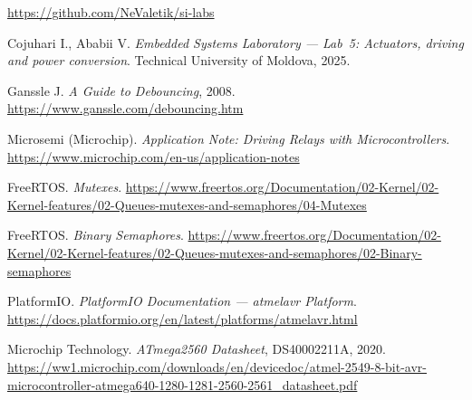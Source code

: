 \documentclass[12pt]{article}
\begin{document}
\begin{thebibliography}{}

  \url{https://github.com/NeValetik/si-labs}

  Cojuhari I., Ababii V. \textit{Embedded Systems Laboratory --- Lab~5: Actuators, driving and power conversion}.
  Technical University of Moldova, 2025.

  Ganssle J. \textit{A Guide to Debouncing}, 2008.
  \url{https://www.ganssle.com/debouncing.htm}

  Microsemi (Microchip). \textit{Application Note: Driving Relays with Microcontrollers}.
  \url{https://www.microchip.com/en-us/application-notes}

  FreeRTOS. \textit{Mutexes}.
  \url{https://www.freertos.org/Documentation/02-Kernel/02-Kernel-features/02-Queues-mutexes-and-semaphores/04-Mutexes}

  FreeRTOS. \textit{Binary Semaphores}.
  \url{https://www.freertos.org/Documentation/02-Kernel/02-Kernel-features/02-Queues-mutexes-and-semaphores/02-Binary-semaphores}

  PlatformIO. \textit{PlatformIO Documentation --- atmelavr Platform}.
  \url{https://docs.platformio.org/en/latest/platforms/atmelavr.html}

  Microchip Technology. \textit{ATmega2560 Datasheet}, DS40002211A, 2020.
  \url{https://ww1.microchip.com/downloads/en/devicedoc/atmel-2549-8-bit-avr-microcontroller-atmega640-1280-1281-2560-2561_datasheet.pdf}

\end{thebibliography}
\endgroup

\pagebreak
\end{document}
